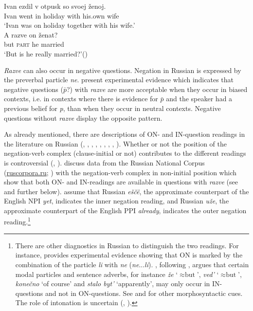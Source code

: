 \documentclass[output=paper,colorlinks,citecolor=brown]{langscibook}
\begin{document}
\ea\label{geist-repp:ex:ivan-otpusk}
\begin{xlist}[M:]
    \gll Ivan	ezdil	v 	otpusk	so 	svoej	ženoj.\\
    Ivan went in holiday with his.own wife \\
    \glt ‘Ivan was on holiday together with his wife.’ \\
\label{geist-repp:ex:ivan-otpusk-B} 
    \gll A razve	on	ženat?\\
    but \textsc{part} he married \\
    \glt ‘But is he really married?’\hfill (\citealt[5]{Zaliznjak2020})
\end{xlist}
\z

\noindent\textit{Razve} can also occur in negative questions. Negation in Russian is expressed by the preverbal particle \textit{ne}. \citet{ReppGeistToAppear} present experimental evidence which indicates that negative questions ($\bar{p}$?) with \textit{razve} are more acceptable when they occur in biased contexts, i.e. in contexts where there is evidence for $\bar{p}$ and the speaker had a previous belief for \textit{p}, than when they occur in neutral contexts. Negative questions without \textit{razve} display the opposite pattern.

As already mentioned, there are descriptions of ON- and IN-question readings in the literature on Russian (\citealt{Restan1972}, \citealt{BaranovKobozeva1983}, \citealt{Brown.Franks1995}, \citealt{Brown1999}, \citealt{Meyer2004}, \citealt{Kobozeva2004}, \citealt{Satunovskij2005}, \citealt{Pancenko2021}, \citealt{ReppGeistToAppear}).  Whether or not the position of the negation-verb complex (clause-initial or not) contributes to the different readings is controversial (\citealt{Brown.Franks1995}, \citealt{Meyer2004}). \citet{ReppGeistToAppear} discuss data from the Russian National Corpus (\url{ruscorpora.ru}; \citealt{Rachilina2008}) with the negation-verb complex in non-initial position which show that both ON- and IN-readings are available in questions with \textit{razve} (see  and  further below). \citet{ReppGeistToAppear} assume that Russian \textit{eščë}, the approximate counterpart of the English NPI \textit{yet}, indicates the inner negation reading, and Russian \textit{uže}, the approximate counterpart of the English PPI \textit{already}, indicates the outer negation reading.\footnote{There are other diagnostics in Russian to distinguish the two readings. For instance, \citet{Pancenko2021} provides experimental evidence showing that ON is marked by the combination of the particle \textit{li} with \textit{ne} (\textit{ne}...\textit{li}). \citet{Meyer2004}, following \citet{Restan1972}, argues that certain modal particles and sentence adverbs, for instance \textit{že} ‘$\approx\text{but}$’,  \textit{ved’} ‘$\approx\text{but}$’, \textit{konečno} ‘of course’ and \textit{stalo byt’} ‘apparently’, may only occur in IN-questions and not in ON-questions. See \citet{Brown.Franks1995} and \citet{Meyer2004} for other morphosyntactic cues. The role of intonation is uncertain (\citealt{Meyer2004}, \citealt{Pancenko2021}).} 
\end{document}
